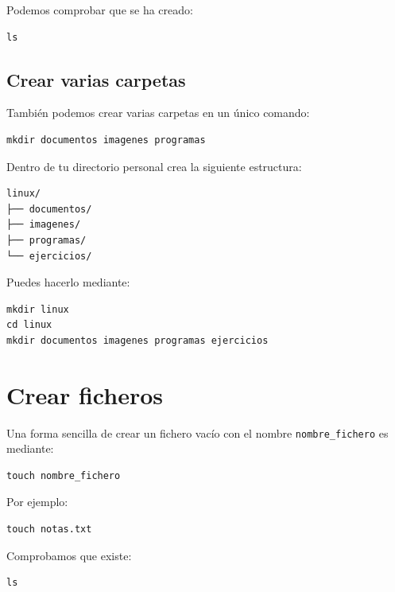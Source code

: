 \documentclass[11pt,a4paper]{article}
\begin{document}
Podemos comprobar que se ha creado:


\begin{lstlisting}
ls
\end{lstlisting}


\subsection{Crear varias carpetas}


También podemos crear varias carpetas en un único comando:


\begin{lstlisting}
mkdir documentos imagenes programas
\end{lstlisting}


\begin{ejercicio}
Dentro de tu directorio personal crea la siguiente estructura:




\begin{lstlisting}
linux/
├── documentos/
├── imagenes/
├── programas/
└── ejercicios/
\end{lstlisting}




Puedes hacerlo mediante:


\begin{lstlisting}
mkdir linux
cd linux
mkdir documentos imagenes programas ejercicios
\end{lstlisting}
\end{ejercicio}


\section{Crear ficheros}


Una forma sencilla de crear un fichero vacío con el nombre \texttt{nombre\_fichero} es mediante:


\begin{lstlisting}
touch nombre_fichero
\end{lstlisting}


\noindent Por ejemplo:


\begin{lstlisting}
touch notas.txt
\end{lstlisting}


\noindent Comprobamos que existe:


\begin{lstlisting}
ls
\end{lstlisting}
\end{document}
